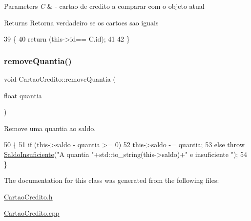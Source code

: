 \begin{DoxyParams}{Parameters}
{\em C} & -\/ cartao de credito a comparar com o objeto atual \\
\hline
\end{DoxyParams}
\begin{DoxyReturn}{Returns}
Retorna verdadeiro se os cartoes sao iguais 
\end{DoxyReturn}

\begin{DoxyCode}
39 \{
40     \textcolor{keywordflow}{return} (this->\textcolor{keywordtype}{id}== C.id);
41 
42 \}
\end{DoxyCode}
\mbox{\label{classCartaoCredito_a57d3f8baa86eb9a8f348dc7cbc91ea42}} 
\subsubsection{\texorpdfstring{remove\+Quantia()}{removeQuantia()}}
{\footnotesize\ttfamily void Cartao\+Credito\+::remove\+Quantia (\begin{DoxyParamCaption}\item[{float}]{quantia }\end{DoxyParamCaption})}



Remove uma quantia ao saldo. 


\begin{DoxyCode}
50 \{
51     \textcolor{keywordflow}{if} (this->saldo - quantia >= 0)
52         this->saldo -= quantia;
53     \textcolor{keywordflow}{else} \textcolor{keywordflow}{throw} \hyperlink{classSaldoInsuficiente}{SaldoInsuficiente}(\textcolor{stringliteral}{"A quantia "}+std::to\_string(this->saldo)+\textcolor{stringliteral}{" e insuficiente
      "});
54 \}
\end{DoxyCode}


The documentation for this class was generated from the following files\+:\begin{DoxyCompactItemize}
\item 
\hyperlink{CartaoCredito_8h}{Cartao\+Credito.\+h}\item 
\hyperlink{CartaoCredito_8cpp}{Cartao\+Credito.\+cpp}\end{DoxyCompactItemize}
